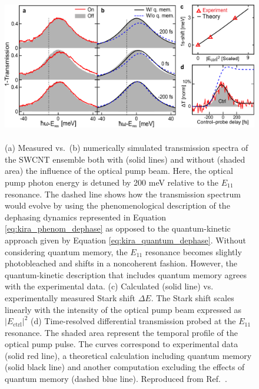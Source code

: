 \begin{figure}[ht]
	\centering
	\includegraphics[height=2.6in]{images/chapter_coherent/nonresonant}
	\caption{(a) Measured vs.\ (b) numerically simulated transmission spectra of the SWCNT ensemble both with (solid lines) and without (shaded area) the influence of the optical pump beam. Here, the optical pump photon energy is detuned by 200 meV relative to the $E_{11}$ resonance. The dashed line shows how the transmission spectrum would evolve by using the phenomenological description of the dephasing dynamics represented in Equation \eqref{eq:kira_phenom_dephase} as opposed to the quantum-kinetic approach given by Equation \eqref{eq:kira_quantum_dephase}. Without considering quantum memory, the $E_{11}$ resonance becomes slightly photobleached and shifts in a noncoherent fashion. However, the quantum-kinetic description that includes quantum memory agrees with the experimental data. (c) Calculated (solid line) vs. experimentally measured Stark shift $\Delta E$. The Stark shift scales linearly with the intensity of the optical pump beam expressed as $|E_\text{ctrl}|^2$ (d) Time-resolved differential transmission probed at the $E_{11}$ resonance. The shaded area represent the temporal profile of the optical pump pulse. The curves correspond to experimental data (solid red line), a theoretical calculation including quantum memory (solid black line) and another computation excluding the effects of quantum memory (dashed blue line). Reproduced from Ref.\ \cite{mack2019}.}

  \label{fig:ose_kira_nonresonant}
\end{figure}

